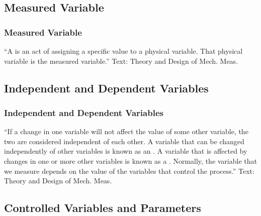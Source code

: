 \documentclass[fleqn]{beamer} %
\newcommand{\sectionIIsubsectionItitle}{Measured Variable}
\newcommand{\sectionIIsubsectionIItitle}{Independent and Dependent Variables}
\newcommand{\sectionIIsubsectionIIItitle}{Controlled Variables and Parameters}
\begin{document}
		\subsection{\sectionIIsubsectionItitle}\label{sectionIIsubsectionI}

			\begin{frame}[label=sectionIIsubsectionI]
				\frametitle{\sectionIIsubsectionItitle}

				\large{``A  {\PR \underline{\hspace{30mm}}} is an act of assigning a specific value to a physical variable. That physical variable
				is the {\GR measured variable}.''} \vspc
				{\tiny Text: Theory and Design of Mech. Meas.}

			\end{frame}

		\subsection{\sectionIIsubsectionIItitle}\label{sectionIIsubsectionII}

			\begin{frame}
				\frametitle{\sectionIIsubsectionIItitle}

				{``If a change in one variable will not affect the value of some other variable, the
				two are considered independent of each other. A variable that can be changed independently of other
				variables is known as an {\PR \underline{\hspace{30mm}}}. A variable that is affected by changes in one or more
				other variables is known as a {\BR \underline{\hspace{30mm}}}. Normally, the variable that we measure depends on
				the value of the variables that control the process.''} \vspc
				{\tiny Text: Theory and Design of Mech. Meas.}

			\end{frame}

		\subsection{\sectionIIsubsectionIIItitle}\label{sectionIIsubsectionIII}
\end{document}

